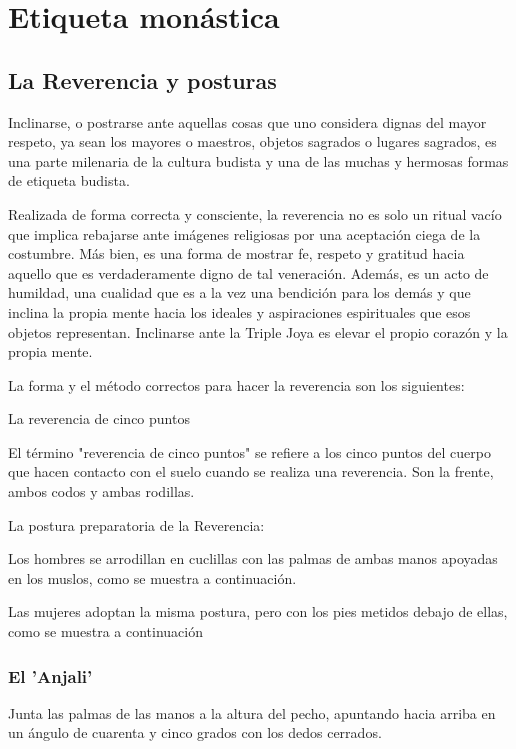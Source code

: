 \chapter*{Etiqueta monástica}
\label{etiquette}

\section{La Reverencia y posturas}

Inclinarse, o postrarse ante aquellas cosas que uno considera dignas del mayor respeto, ya sean los mayores o maestros, objetos sagrados o lugares sagrados, es una parte milenaria de la cultura budista y una de las muchas y hermosas formas de etiqueta budista.

Realizada de forma correcta y consciente, la reverencia no es solo un ritual vacío que implica rebajarse ante imágenes religiosas por una aceptación ciega de la costumbre. Más bien, es una forma de mostrar fe, respeto y gratitud hacia aquello que es verdaderamente digno de tal veneración. Además, es un acto de humildad, una cualidad que es a la vez una bendición para los demás y que inclina la propia mente hacia los ideales y aspiraciones espirituales que esos objetos representan. Inclinarse ante la Triple Joya es elevar el propio corazón y la propia mente.

La forma y el método correctos para hacer la reverencia son los siguientes:

La reverencia de cinco puntos

El término "reverencia de cinco puntos" se refiere a los cinco puntos del cuerpo que hacen contacto con el suelo cuando se realiza una reverencia. Son la frente, ambos codos y ambas rodillas.

La postura preparatoria de la  Reverencia:

Los hombres se arrodillan en cuclillas con las palmas de ambas manos apoyadas en los muslos, como se muestra a continuación.

Las mujeres adoptan la misma postura, pero con los pies metidos debajo de ellas, como se muestra a continuación

\subsection{El 'Anjali'}

Junta las palmas de las manos a la altura del pecho, apuntando hacia arriba en un ángulo de cuarenta y cinco grados con los dedos cerrados.

